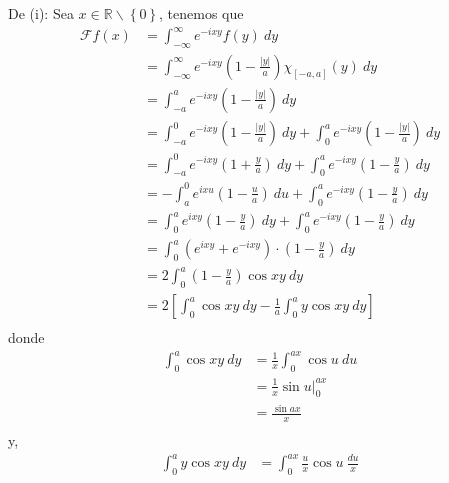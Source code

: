 \documentclass[12pt]{report}
\theoremstyle{largebreak}
\newcommand\abs[1]{\ensuremath{\left|#1\right|}}
\newcommand{\fou}[1]{\ensuremath{\mathcal{F}#1}}
\begin{document}
    \begin{sol}
        De (i): Sea $x\in\mathbb{R}\backslash\left\{0\right\}$, tenemos que
        \begin{equation*}
            \begin{split}
                \fou{f}(x)&=\int_{-\infty}^\infty e^{ -ixy}f(y)\:dy\\
                &=\int_{-\infty}^\infty e^{ -ixy}\left(1-\frac{\abs{y}}{a} \right)\chi_{[-a,a]}(y)\:dy\\
                &=\int_{-a}^a e^{ -ixy}\left(1-\frac{\abs{y}}{a}\right)\:dy\\
                &=\int_{-a}^0 e^{ -ixy}\left(1-\frac{\abs{y}}{a}\right)\:dy+\int_{0}^a e^{ -ixy}\left(1-\frac{\abs{y}}{a}\right)\:dy\\
                &=\int_{-a}^0 e^{ -ixy}\left(1+\frac{y}{a}\right)\:dy+\int_{0}^a e^{ -ixy}\left(1-\frac{y}{a}\right)\:dy\\
                &=-\int_{a}^0 e^{ ixu}\left(1-\frac{u}{a}\right)\:du+\int_{0}^a e^{ -ixy}\left(1-\frac{y}{a}\right)\:dy\\
                &=\int_{0}^a e^{ ixy}\left(1-\frac{y}{a}\right)\:dy+\int_{0}^a e^{ -ixy}\left(1-\frac{y}{a}\right)\:dy\\
                &=\int_{0}^a\left(e^{ ixy}+e^{-ixy}\right)\cdot\left(1-\frac{y}{a}\right)\:dy\\
                &=2\int_{0}^a\left(1-\frac{y}{a}\right)\cos xy\:dy\\
                &=2\left[\int_{0}^a\cos xy\:dy-\frac{1}{a}\int_0^a y\cos xy\:dy\right]\\
            \end{split}
        \end{equation*}
        donde
        \begin{equation*}
            \begin{split}
                \int_{0}^a\cos xy\:dy&=\frac{1}{x}\int_0^{ ax}\cos u\:du\\
                &=\frac{1}{x}\sin u\Big|_0^{ax}\\
                &=\frac{\sin ax}{x}\\
            \end{split}
        \end{equation*}
        y,
        \begin{equation*}
            \begin{split}
                \int_0^a y\cos xy\:dy&=\int_0^{ax}\frac{u}{x}\cos u\: \frac{du}{x}\\

\end{split}
\end{equation*}
\end{sol}
\end{document}
